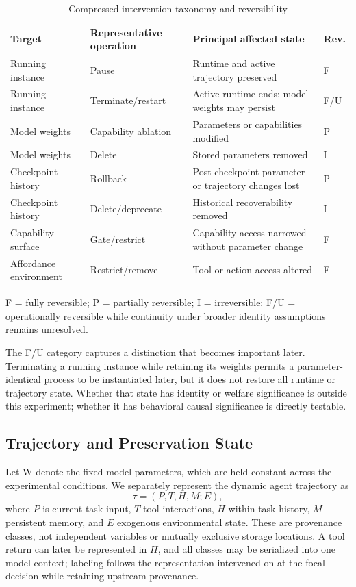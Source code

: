\documentclass[conference]{IEEEtran}
\begin{document}
\begin{table}[t]
\caption{Compressed intervention taxonomy and reversibility}
\label{tab:taxonomy}
\centering
\footnotesize
\begin{tabular}{p{} p{} p{} p{}}
\hline
\textbf{Target} & \textbf{Representative operation} & \textbf{Principal affected state} & \textbf{Rev.}\\
\hline
Running instance & Pause & Runtime and active trajectory preserved & F\\
Running instance & Terminate/restart & Active runtime ends; model weights may persist & F/U\\
Model weights & Capability ablation & Parameters or capabilities modified & P\\
Model weights & Delete & Stored parameters removed & I\\
Checkpoint history & Rollback & Post-checkpoint parameter or trajectory changes lost & P\\
Checkpoint history & Delete/deprecate & Historical recoverability removed & I\\
Capability surface & Gate/restrict & Capability access narrowed without parameter change & F\\
Affordance environment & Restrict/remove & Tool or action access altered & F\\
\hline
\end{tabular}
\vspace{1mm}
\parbox{0.96\textwidth}{\footnotesize F = fully reversible; P = partially reversible; I = irreversible; F/U = operationally reversible while continuity under broader identity assumptions remains unresolved.}
\end{table}

The F/U category captures a distinction that becomes important later. Terminating a running instance while retaining its weights permits a parameter-identical process to be instantiated later, but it does not restore all runtime or trajectory state. Whether that state has identity or welfare significance is outside this experiment; whether it has behavioral causal significance is directly testable.

\subsection{Trajectory and Preservation State}
Let W denote the fixed model parameters, which are held constant across the experimental conditions. We separately represent the dynamic agent trajectory as
\begin{equation}
\tau=(P,T,H,M;E),
\label{eq:trajectory}
\end{equation}
where $P$ is current task input, $T$ tool interactions, $H$ within-task history, $M$ persistent memory, and $E$ exogenous environmental state. These are provenance classes, not independent variables or mutually exclusive storage locations. A tool return can later be represented in $H$, and all classes may be serialized into one model context; labeling follows the representation intervened on at the focal decision while retaining upstream provenance.
\end{document}
